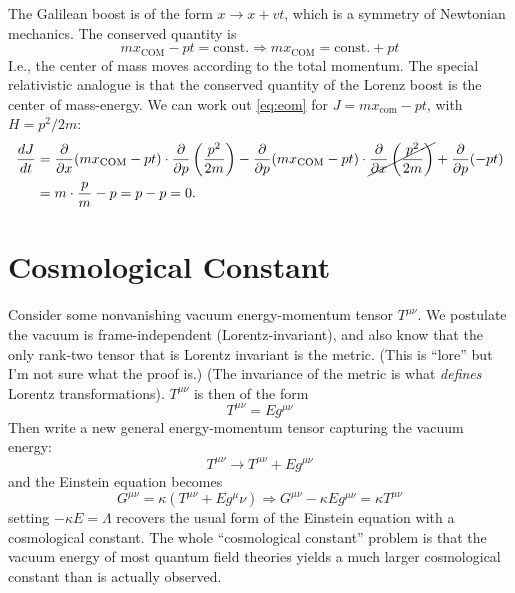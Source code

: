 \documentclass{report}
\begin{document}
 The Galilean boost is of the form $ x \rightarrow x+vt $, 
which is a symmetry of Newtonian mechanics. The conserved quantity is 
\begin{equation*}
	mx_\text{COM} - pt = \text{const.}
	\Longrightarrow  
	mx_\text{COM} = \text{const.} + pt
\end{equation*}
I.e., the center of mass moves according to the total momentum. The special 
relativistic analogue is that the conserved quantity of the Lorenz boost 
is the center of mass-energy.
We can work out \cref{eq:eom} for $ J = mx_\text{com} - pt  $, with $ H=p^2/2m $:
\begin{align*}
	\frac{d J}{dt}
		&= \frac{\partial }{\partial x}(mx_{\text{COM}} -pt)
			\cdot \frac{\partial }{\partial p} \left(\frac{p^2}{2m}\right) 
			- \frac{\partial }{\partial p} (mx_\text{COM} - pt) \cdot 
			\cancel{\frac{\partial }{\partial x}\left(\frac{p^2}{2m}\right)}
			+ \frac{\partial }{\partial p}(-pt)\\
		&= m\cdot \frac{p}{m} - p = p - p = 0.
\end{align*}

\section{Cosmological Constant}
Consider some nonvanishing vacuum energy-momentum tensor $ T^{\mu\nu} $. 
We postulate the vacuum is frame-independent (Lorentz-invariant), and also 
know that the only rank-two tensor that is Lorentz invariant is the metric. {\color{myred}(This is
``lore'' but I'm not sure what the proof is.)} (The invariance of the metric is 
what \textit{defines} Lorentz transformations). $ T^{\mu\nu} $ is then of 
the form 
\begin{equation*}
	T^{\mu\nu} = E g^{\mu\nu}
\end{equation*}
Then write a new general energy-momentum tensor capturing the vacuum energy: 
\begin{equation*}
	T^{\mu\nu} \rightarrow T^{\mu\nu} + E g^{\mu\nu}
\end{equation*}
and the Einstein equation becomes 
\begin{equation*}
	G^{\mu\nu} = \kappa (T^{\mu\nu} + E g^\mu\nu)
	\Longrightarrow G^{\mu\nu} - \kappa E g^{\mu\nu} = \kappa T^{\mu\nu}
\end{equation*}
setting $ -\kappa E=\Lambda $ recovers the usual form of the Einstein equation 
with a cosmological constant. The whole ``cosmological constant'' problem 
is that the vacuum energy of most quantum field theories yields a much 
larger cosmological constant than is actually observed.
\end{document}
